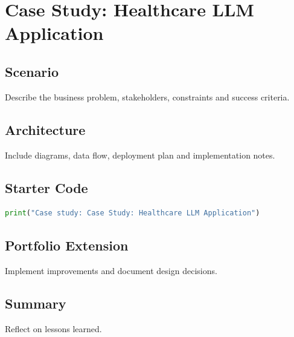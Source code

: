 \chapter{Case Study: Healthcare LLM Application}
\label{chap:vol14-4}



\section{Scenario}
Describe the business problem, stakeholders, constraints and success criteria.

\section{Architecture}
Include diagrams, data flow, deployment plan and implementation notes.

\section{Starter Code}
\begin{lstlisting}[language=Python]
print("Case study: Case Study: Healthcare LLM Application")
\end{lstlisting}

\section{Portfolio Extension}
Implement improvements and document design decisions.

\section{Summary}
Reflect on lessons learned.
